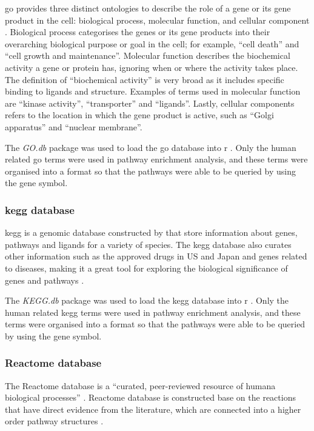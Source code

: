 \gls{go} provides three distinct ontologies to describe the role of a gene or its gene product in the cell: biological process, molecular function, and cellular component \citep{GO2000}.
Biological process categorises the genes or its gene products into their overarching biological purpose or goal in the cell; for example, ``cell death'' and ``cell growth and maintenance''.
Molecular function describes the biochemical activity a gene or protein has, ignoring when or where the activity takes place.
The definition of ``biochemical activity'' is very broad as it includes specific binding to ligands and structure.
Examples of terms used in molecular function are ``kinase activity'', ``transporter'' and ``ligands''.
Lastly, cellular components refers to the location in which the gene product is active, such as ``Golgi apparatus'' and ``nuclear membrane''.

The \textit{GO.db} package was used to load the \gls{go} database into \gls{r} \citep{Carlson2016}.
Only the human related \gls{go} terms were used in pathway enrichment analysis, and these terms were organised into a format so that the pathways were able to be queried by using the gene symbol.

\subsubsection{\gls{kegg} database}
\label{ssub:kegg_database}

\gls{kegg} is a genomic database constructed by \citet{Kanehisa2000} that store information about genes, pathways and ligands for a variety of species.
The \gls{kegg} database also curates other information such as the approved drugs in US and Japan and genes related to diseases, making it a great tool for exploring the biological significance of genes and pathways \citep{Kanehisa2008}.

The \textit{KEGG.db} package was used to load the \gls{kegg} database into \gls{r} \citep{kegg}.
Only the human related \gls{kegg} terms were used in pathway enrichment analysis, and these terms were organised into a format so that the pathways were able to be queried by using the gene symbol.

\subsubsection{Reactome database}
\label{ssub:Reactome_database}

The Reactome database is a ``curated, peer-reviewed resource of humana biological processes'' \citep{Joshi2005}.
Reactome database is constructed base on the reactions that have direct evidence from the literature, which are connected into a higher order pathway structures \citep{Joshi2005}.

